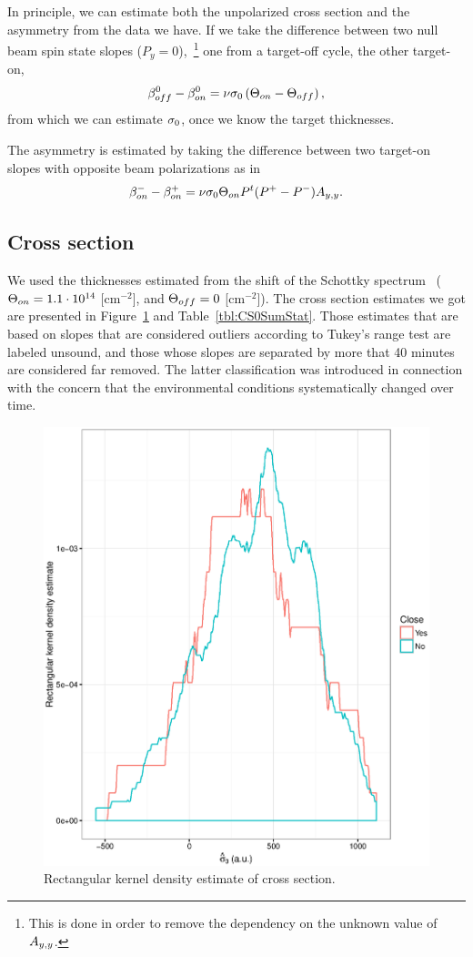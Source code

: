 \documentclass{report}
\begin{document}
In principle, we can estimate both the unpolarized cross section and the asymmetry from the data we have. If we take the difference between two null beam spin state slopes ($P_y = 0$),~\footnote{This is done in order to remove the dependency on the unknown value of $\Ayy$.} one from a target-off cycle, the other target-on, 
\[
	\slp[off]^0 - \slp[on]^0 = \nu\CS[0]\bkt{\Thick[on]-\Thick[off]},
\]
from which we can estimate $\CS[0]$, once we know the target thicknesses.

The asymmetry is estimated by taking the difference between two target-on slopes with opposite beam polarizations as in
\[
	\slp[on]^- - \slp[on]^+ = \nu\CS[0]\Thick[on] P^t\DP*\Ayy.
\]
\subsection{Cross section}
We used the thicknesses estimated from the shift of the Schottky spectrum~\cite{Stein} ($\Thick[on] = \vp{1.1}{14}$ [cm$^{-2}$], and $\Thick[off] = 0$ [cm$^{-2}$]). The cross section estimates we got are presented in Figure~\ref{fig:CS0au_dens} and Table~\ref{tbl:CS0SumStat}. Those estimates that are based on slopes that are considered outliers according to Tukey's range test are labeled unsound, and those whose slopes are separated by more that 40 minutes are considered far removed. The latter classification was introduced in connection with the concern that the environmental conditions systematically changed over time.

\begin{figure}[H]
	\centering
	\includegraphics{CS0_au_dens.eps}
	\caption{Rectangular kernel density estimate of cross section.\label{fig:CS0au_dens}}
\end{figure}
\end{document}
